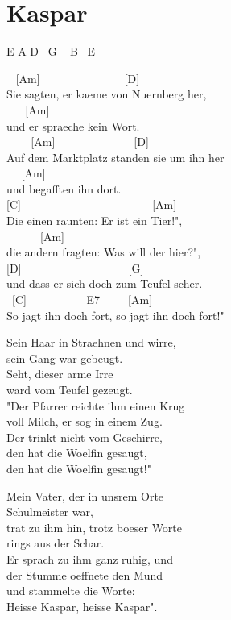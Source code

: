 \documentclass[
  letterpaper,
  twoside=false]{scrbook}
\begin{document}
\hypertarget{kaspar}{%
\chapter{Kaspar}\label{kaspar}}

E A D ~G ~ B ~E

~ {[}Am{]} ~ ~ ~ ~ ~ ~ ~ ~ ~{[}D{]}\\
Sie sagten, er kaeme von Nuernberg her,\\
\hspace*{0.333em} ~ ~ {[}Am{]}\\
und er spraeche kein Wort.\\
\hspace*{0.333em} ~ ~ ~{[}Am{]} ~ ~ ~ ~ ~ ~ ~ ~ {[}D{]} ~\\
Auf dem Marktplatz standen sie um ihn her\\
\hspace*{0.333em} ~ ~{[}Am{]}\\
und begafften ihn dort.\\
\hspace*{0.333em} {[}C{]} ~ ~ ~ ~ ~ ~ ~ ~ ~ ~ ~ ~ ~ ~{[}Am{]}\\
Die einen raunten: Er ist ein Tier!", ~\\
\hspace*{0.333em} ~ ~ ~ ~{[}Am{]}\\
die andern fragten: Was will der hier?",\\
{[}D{]} ~ ~ ~ ~ ~ ~ ~ ~ ~ ~ ~ {[}G{]}\\
und dass er sich doch zum Teufel scher\textquotesingle.\\
\hspace*{0.333em} ~{[}C{]} ~ ~ ~ ~ ~ ~ E7 ~ ~ ~{[}Am{]}\\
So jagt ihn doch fort, so jagt ihn doch fort!"

Sein Haar in Straehnen und wirre,\\
sein Gang war gebeugt.\\
Seht, dieser arme Irre\\
ward vom Teufel gezeugt.\\
"Der Pfarrer reichte ihm einen Krug\\
voll Milch, er sog in einem Zug.\\
Der trinkt nicht vom Geschirre,\\
den hat die Woelfin gesaugt,\\
den hat die Woelfin gesaugt!"

Mein Vater, der in uns\textquotesingle rem Orte\\
Schulmeister war,\\
trat zu ihm hin, trotz boeser Worte\\
rings aus der Schar.\\
Er sprach zu ihm ganz ruhig, und\\
der Stumme oeffnete den Mund\\
und stammelte die Worte:\\
Heisse Kaspar, heisse Kaspar".
\end{document}
